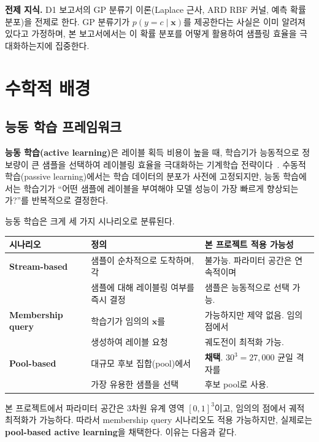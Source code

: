 \documentclass[11pt]{article}
\begin{document}
\textbf{전제 지식.} D1 보고서의 GP 분류기 이론(Laplace 근사, ARD RBF 커널, 예측 확률 분포)을 전제로 한다. GP 분류기가 $p(y = c \mid \mathbf{x})$를 제공한다는 사실은 이미 알려져 있다고 가정하며, 본 보고서에서는 이 확률 분포를 어떻게 활용하여 샘플링 효율을 극대화하는지에 집중한다.


\section{수학적 배경}

\subsection{능동 학습 프레임워크}

\textbf{능동 학습(active learning)}은 레이블 획득 비용이 높을 때, 학습기가 능동적으로 정보량이 큰 샘플을 선택하여 레이블링 효율을 극대화하는 기계학습 전략이다~\cite{Settles2009}. 수동적 학습(passive learning)에서는 학습 데이터의 분포가 사전에 고정되지만, 능동 학습에서는 학습기가 ``어떤 샘플에 레이블을 부여해야 모델 성능이 가장 빠르게 향상되는가?''를 반복적으로 결정한다.

능동 학습은 크게 세 가지 시나리오로 분류된다.

\begin{table}[htbp]
\centering
\small
\begin{tabular}{@{}lll@{}}
\toprule
시나리오 & 정의 & 본 프로젝트 적용 가능성 \\
\midrule
\textbf{Stream-based} & 샘플이 순차적으로 도착하며, 각 & 불가능. 파라미터 공간은 연속적이며 \\
 & 샘플에 대해 레이블링 여부를 즉시 결정 & 샘플은 능동적으로 선택 가능. \\
\textbf{Membership query} & 학습기가 임의의 $\mathbf{x}$를 & 가능하지만 제약 없음. 임의 점에서 \\
 & 생성하여 레이블 요청 & 궤도전이 최적화 가능. \\
\textbf{Pool-based} & 대규모 후보 집합(pool)에서 & \textbf{채택}. $30^3 = 27{,}000$ 균일 격자를 \\
 & 가장 유용한 샘플을 선택 & 후보 pool로 사용. \\
\bottomrule
\end{tabular}
\end{table}

본 프로젝트에서 파라미터 공간은 3차원 유계 영역 $[0,1]^3$이고, 임의의 점에서 궤적 최적화가 가능하다. 따라서 membership query 시나리오도 적용 가능하지만, 실제로는 \textbf{pool-based active learning}을 채택한다. 이유는 다음과 같다.
\end{document}
